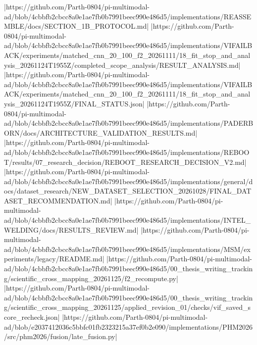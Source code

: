 |https://github.com/Parth-0804/pi-multimodal-ad/blob/4cbbfb2cbcc8a0e1ae7fb0b7991beec990e486d5/implementations/REASSEMBLE/docs/SECTION_1B_PROTOCOL.md|
|https://github.com/Parth-0804/pi-multimodal-ad/blob/4cbbfb2cbcc8a0e1ae7fb0b7991beec990e486d5/implementations/VIFAILBACK/experiments/matched_cnn_20_100_f2_20261111/18_fit_stop_and_analysis_20261124T1955Z/completed_scope_analysis/RESULT_ANALYSIS.md|
|https://github.com/Parth-0804/pi-multimodal-ad/blob/4cbbfb2cbcc8a0e1ae7fb0b7991beec990e486d5/implementations/VIFAILBACK/experiments/matched_cnn_20_100_f2_20261111/18_fit_stop_and_analysis_20261124T1955Z/FINAL_STATUS.json|
|https://github.com/Parth-0804/pi-multimodal-ad/blob/4cbbfb2cbcc8a0e1ae7fb0b7991beec990e486d5/implementations/PADERBORN/docs/ARCHITECTURE_VALIDATION_RESULTS.md|
|https://github.com/Parth-0804/pi-multimodal-ad/blob/4cbbfb2cbcc8a0e1ae7fb0b7991beec990e486d5/implementations/REBOOT/results/07_research_decision/REBOOT_RESEARCH_DECISION_V2.md|
|https://github.com/Parth-0804/pi-multimodal-ad/blob/4cbbfb2cbcc8a0e1ae7fb0b7991beec990e486d5/implementations/general/docs/dataset_research/NEW_DATASET_SELECTION_20261028/FINAL_DATASET_RECOMMENDATION.md|
|https://github.com/Parth-0804/pi-multimodal-ad/blob/4cbbfb2cbcc8a0e1ae7fb0b7991beec990e486d5/implementations/INTEL_WELDING/docs/RESULTS_REVIEW.md|
|https://github.com/Parth-0804/pi-multimodal-ad/blob/4cbbfb2cbcc8a0e1ae7fb0b7991beec990e486d5/implementations/MSM/experiments/legacy/README.md|
|https://github.com/Parth-0804/pi-multimodal-ad/blob/4cbbfb2cbcc8a0e1ae7fb0b7991beec990e486d5/00_thesis_writing_tracking/scientific_cross_mapping_20261125/f2_recompute.py|
|https://github.com/Parth-0804/pi-multimodal-ad/blob/4cbbfb2cbcc8a0e1ae7fb0b7991beec990e486d5/00_thesis_writing_tracking/scientific_cross_mapping_20261125/applied_revision_01/checks/vif_saved_score_recheck.json|
|https://github.com/Parth-0804/pi-multimodal-ad/blob/e2037412036c5bbfc01fb2323215a37ef0b2e090/implementations/PHM2026/src/phm2026/fusion/late_fusion.py|

